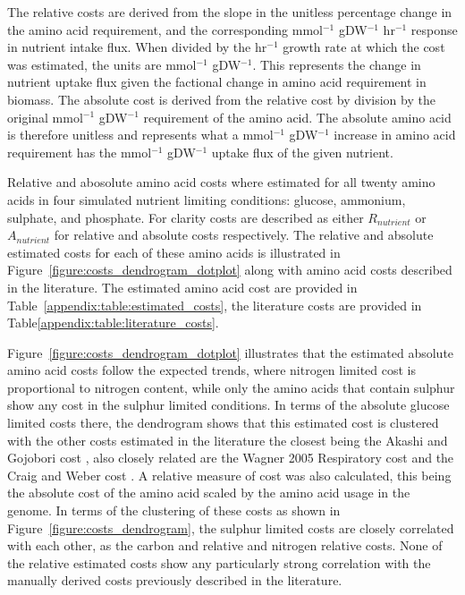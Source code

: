 The relative costs are derived from the slope in the unitless percentage change in the amino acid requirement, and the corresponding mmol$^{-1}$ gDW$^{-1}$ hr$^{-1}$ response in nutrient intake flux. When divided by the hr$^{-1}$ growth rate at which the cost was estimated, the units are mmol$^{-1}$ gDW$^{-1}$. This represents the change in nutrient uptake flux given the factional change in amino acid requirement in biomass. The absolute cost is derived from the relative cost by division by the original mmol$^{-1}$ gDW$^{-1}$ requirement of the amino acid. The absolute amino acid is therefore unitless and represents what a mmol$^{-1}$ gDW$^{-1}$ increase in amino acid requirement has the mmol$^{-1}$ gDW$^{-1}$ uptake flux of the given nutrient.

Relative and abosolute amino acid costs where estimated for all twenty amino acids in four simulated nutrient limiting conditions: glucose, ammonium, sulphate, and phosphate. For clarity costs are described as either $R_{nutrient}$ or $A_{nutrient}$ for relative and absolute costs respectively. The relative and absolute estimated costs for each of these amino acids is illustrated in Figure~\vref{figure:costs_dendrogram_dotplot} along with amino acid costs described in the literature. The estimated amino acid cost are provided in Table~\vref{appendix:table:estimated_costs}, the literature costs are provided in Table\vref{appendix:table:literature_costs}.


Figure~\ref{figure:costs_dendrogram_dotplot} illustrates that the estimated absolute amino acid costs follow the expected trends, where nitrogen limited cost is proportional to nitrogen content, while only the amino acids that contain sulphur show any cost in the sulphur limited conditions. In terms of the absolute glucose limited costs there, the dendrogram shows that this estimated cost is clustered with the other costs estimated in the literature the closest being the Akashi and Gojobori cost \cite{akashi2002}, also closely related are the Wagner 2005 Respiratory cost \cite{wagner2005} and the Craig and Weber cost \cite{craig1998}. A relative measure of cost was also calculated, this being the absolute cost of the amino acid scaled by the amino acid usage in the genome. In terms of the clustering of these costs as shown in Figure~\ref{figure:costs_dendrogram}, the sulphur limited costs are closely correlated with each other, as the carbon and relative and nitrogen relative costs. None of the relative estimated costs show any particularly strong correlation with the manually derived costs previously described in the literature.

